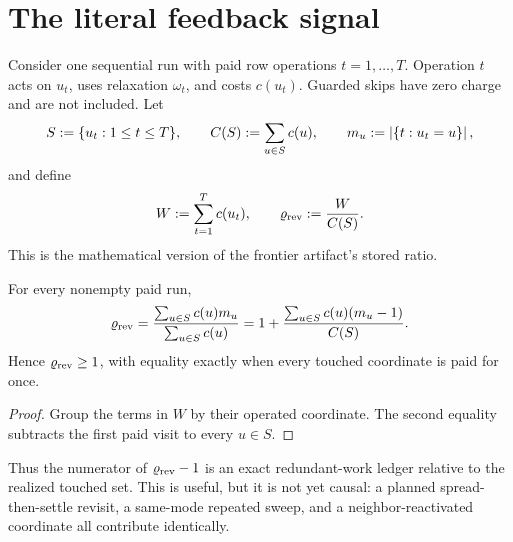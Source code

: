\section{The literal feedback signal}
\label{sec:literal}

Consider one sequential run with paid row operations
$t=1,\ldots,T$.  Operation $t$ acts on $u_t$, uses relaxation
$\omega_t$, and costs $c(u_t)$.  Guarded skips have zero charge and are not
included.  Let
\begin{equation}
 S:=\{u_t:1\leq t\leq T\},
 \qquad
 C(S):=\sum_{u\in S}c(u),
 \qquad
 m_u:=\left\lvert \{t:u_t=u\} \right\rvert,
 \label{eq:touched}
\end{equation}
and define
\begin{equation}
 W:=\sum_{t=1}^T c(u_t),
 \qquad
 \varrho_{\rm rev}:=\frac{W}{C(S)}.
 \label{eq:revisit}
\end{equation}
This is the mathematical version of the frontier artifact's stored ratio.

\begin{lemma}
\label{lem:multiplicity}
For every nonempty paid run,
\begin{equation}
 \varrho_{\rm rev}
 =\frac{\sum_{u\in S}c(u)m_u}{\sum_{u\in S}c(u)}
 =1+\frac{\sum_{u\in S}c(u)(m_u-1)}{C(S)}.
 \label{eq:multiplicity}
\end{equation}
Hence $\varrho_{\rm rev}\geq1$, with equality exactly when every touched
coordinate is paid for once.
\end{lemma}

\begin{proof}
Group the terms in $W$ by their operated coordinate.  The second equality
subtracts the first paid visit to every $u\in S$.
\end{proof}

Thus the numerator of $\varrho_{\rm rev}-1$ is an exact redundant-work
ledger relative to the realized touched set.  This is useful, but it is not
yet causal: a planned spread-then-settle revisit, a same-mode repeated sweep,
and a neighbor-reactivated coordinate all contribute identically.
